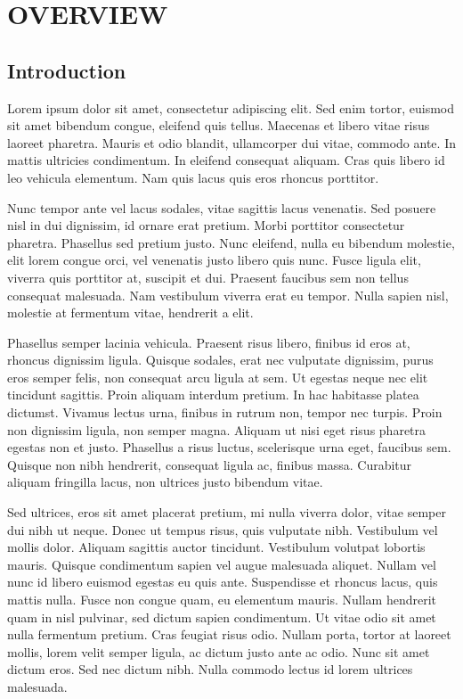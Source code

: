 \chapter{OVERVIEW}

\section{Introduction}

Lorem ipsum dolor sit amet, consectetur adipiscing elit. Sed enim tortor, euismod sit amet bibendum congue, eleifend quis tellus. Maecenas et libero vitae risus laoreet pharetra. Mauris et odio blandit, ullamcorper dui vitae, commodo ante. In mattis ultricies condimentum. In eleifend consequat aliquam. Cras quis libero id leo vehicula elementum. Nam quis lacus quis eros rhoncus porttitor.

Nunc tempor ante vel lacus sodales, vitae sagittis lacus venenatis. Sed posuere nisl in dui dignissim, id ornare erat pretium. Morbi porttitor consectetur pharetra. Phasellus sed pretium justo. Nunc eleifend, nulla eu bibendum molestie, elit lorem congue orci, vel venenatis justo libero quis nunc. Fusce ligula elit, viverra quis porttitor at, suscipit et dui. Praesent faucibus sem non tellus consequat malesuada. Nam vestibulum viverra erat eu tempor. Nulla sapien nisl, molestie at fermentum vitae, hendrerit a elit.

Phasellus semper lacinia vehicula. Praesent risus libero, finibus id eros at, rhoncus dignissim ligula. Quisque sodales, erat nec vulputate dignissim, purus eros semper felis, non consequat arcu ligula at sem. Ut egestas neque nec elit tincidunt sagittis. Proin aliquam interdum pretium. In hac habitasse platea dictumst. Vivamus lectus urna, finibus in rutrum non, tempor nec turpis. Proin non dignissim ligula, non semper magna. Aliquam ut nisi eget risus pharetra egestas non et justo. Phasellus a risus luctus, scelerisque urna eget, faucibus sem. Quisque non nibh hendrerit, consequat ligula ac, finibus massa. Curabitur aliquam fringilla lacus, non ultrices justo bibendum vitae.

Sed ultrices, eros sit amet placerat pretium, mi nulla viverra dolor, vitae semper dui nibh ut neque. Donec ut tempus risus, quis vulputate nibh. Vestibulum vel mollis dolor. Aliquam sagittis auctor tincidunt. Vestibulum volutpat lobortis mauris. Quisque condimentum sapien vel augue malesuada aliquet. Nullam vel nunc id libero euismod egestas eu quis ante. Suspendisse et rhoncus lacus, quis mattis nulla. Fusce non congue quam, eu elementum mauris. Nullam hendrerit quam in nisl pulvinar, sed dictum sapien condimentum. Ut vitae odio sit amet nulla fermentum pretium. Cras feugiat risus odio. Nullam porta, tortor at laoreet mollis, lorem velit semper ligula, ac dictum justo ante ac odio. Nunc sit amet dictum eros. Sed nec dictum nibh. Nulla commodo lectus id lorem ultrices malesuada.


